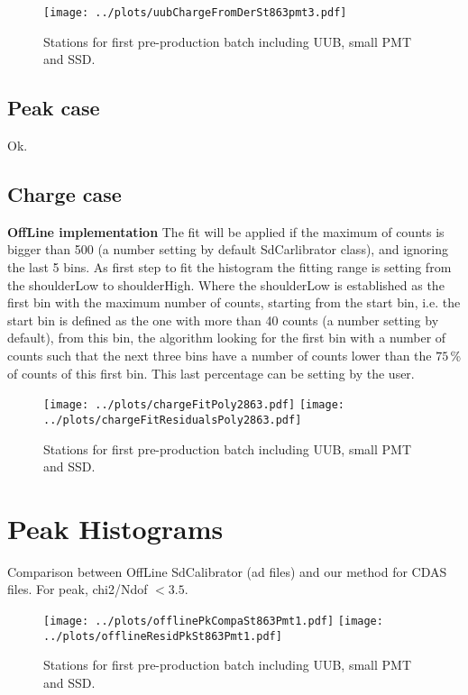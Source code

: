 \documentclass[twoside, final, 10pt]{articleMine}
\begin{document}
\begin{figure}[!tbh]
  \centering
  \subfigure
  {
    \texttt{[image: ../plots/uubChargeFromDerSt863pmt3.pdf]}
  }
  \caption{Stations for first pre-production batch including UUB, small PMT and SSD.}
  \label{figChVemCompFitDerTimePmt3}
\end{figure}
\clearpage



\subsection*{Peak case}
Ok.

\subsection*{Charge case}
{\bf OffLine implementation}
The fit will be applied if the maximum of counts is bigger
than 500 (a number setting by default SdCarlibrator class),
and ignoring the last 5 bins. As first step to fit the
histogram the fitting range is setting from the shoulderLow to
shoulderHigh. Where the shoulderLow is established as the
first bin with the maximum number of counts, starting from the
start bin, i.e. the start bin is defined as the one with more
than 40 counts (a number setting by default), from this bin,
the algorithm looking for the first bin with a number of
counts such that the next three bins have a number of counts
lower than the $75$\,\% of counts of this first bin. This last
percentage can be setting by the user.

\begin{figure}[!tbh]
  \centering
  \subfigure
  {
    \texttt{[image: ../plots/chargeFitPoly2863.pdf]}
    \texttt{[image: ../plots/chargeFitResidualsPoly2863.pdf]}
  }
  \caption{Stations for first pre-production batch including UUB, small PMT and SSD.}
  \label{figPkVemserie}
\end{figure}
\clearpage

\section*{Peak Histograms}
Comparison between OffLine SdCalibrator (ad files) and our method for CDAS files.
For peak, chi2/Ndof $<3.5$.

\begin{figure}[!tbh]
  \centering
  \subfigure
  {
    \texttt{[image: ../plots/offlinePkCompaSt863Pmt1.pdf]}
    \texttt{[image: ../plots/offlineResidPkSt863Pmt1.pdf]}
  }
  \caption{Stations for first pre-production batch including UUB, small PMT and SSD.}
  \label{figPkVemserie}
\end{figure}
\end{document}
